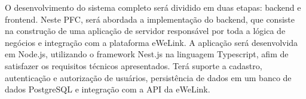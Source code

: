 O desenvolvimento do sistema completo será dividido em duas etapas: backend e frontend. Neste \acrlong{PFC}, será abordada a implementação do backend, que consiste na construção de uma aplicação de servidor responsável por toda a lógica de negócios e integração com a plataforma eWeLink. A aplicação será desenvolvida em Node.js, utilizando o framework Nest.js na linguagem Typescript, afim de satisfazer os requisitos técnicos apresentados. Terá suporte a cadastro, autenticação e autorização de usuários, persistência de dados em um banco de dados PostgreSQL e integração com a API da eWeLink.

